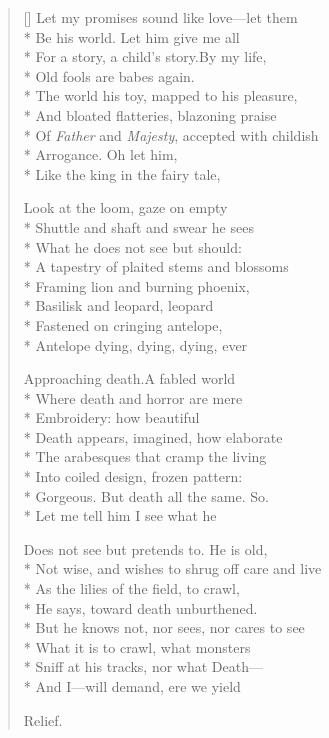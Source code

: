 \label{ch:lear_ad}
\settowidth{\versewidth}{Not wise, and wishes to shrug off care and live}
\begin{verse}[\versewidth]
 Let my promises sound like love---let them\\*
Be his world.  Let him give me all\\*
For a story, a child's story.\qquad By my life,\\*
Old fools are babes again.\\*
The world his toy, mapped to his pleasure,\\*
And bloated flatteries, blazoning praise\\*
Of \textit{Father} and \textit{Majesty}, accepted with childish\\*
Arrogance.  Oh let him,\\*
Like the king in the fairy tale,

Look at the loom, gaze on empty\\*
Shuttle and shaft and swear he sees\\*
What he does not see but should:\\*
A tapestry of plaited stems and blossoms\\*
Framing lion and burning phoenix,\\*
Basilisk and leopard, leopard\\*
Fastened on cringing antelope,\\*
Antelope dying, dying, dying, ever

Approaching death.\qquad A fabled world\\*
Where death and horror are mere\\*
Embroidery: how beautiful\\*
Death appears, imagined, how elaborate\\*
The arabesques that cramp the living\\*
Into coiled design, frozen pattern:\\*
Gorgeous. But death all the same. So.\\*
Let me tell him I see what he

Does not see but pretends to.  He is old,\\*
Not wise, and wishes to shrug off care and live\\*
As the lilies of the field, to crawl,\\*
He says, toward death unburthened.\\*
But he knows not, nor sees, nor cares to see\\*
What it is to crawl, what monsters\\*
Sniff at his tracks, nor what Death---\\*
And I---will demand, ere we yield

Relief.
\end{verse}
